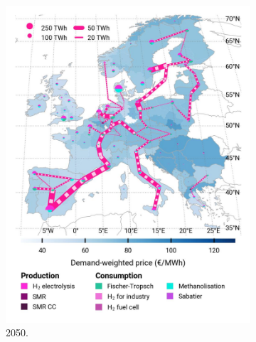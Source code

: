 \documentclass[preprint,12pt,sort&compress]{elsarticle}
\begin{document}
\begin{figure}[htbp]
\begin{subfigure}[t]{0.33\textwidth}
    \includegraphics[width=1\textwidth]{maps/pcipmi/base_s_adm___2050-balance_map_H2}
    \caption{ 2050.}
    \label{fig:PCI_lt_2050_h2}
  \end{subfigure}
  \begin{subfigure}[t]{0.33\textwidth}
      \vspace{0pt}

\end{subfigure}
\end{figure}
\end{document}
